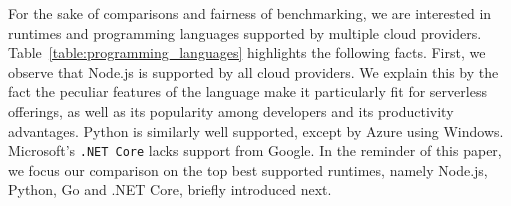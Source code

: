 For the sake of comparisons and fairness of benchmarking, we are interested in runtimes and programming languages supported by multiple cloud providers.  
Table~\ref{table:programming_languages} highlights the following facts.
First, we observe that Node.js is supported by all cloud providers.
We explain this by the fact the peculiar features of the language make it particularly fit for serverless offerings, as well as its popularity among developers and its productivity advantages.
Python is similarly well supported, except by Azure using Windows. %
Microsoft's \texttt{.NET Core} lacks support from Google. 
In the reminder of this paper, we focus our comparison on the top best supported runtimes, namely Node.js, Python, Go and .NET Core, briefly introduced next.


